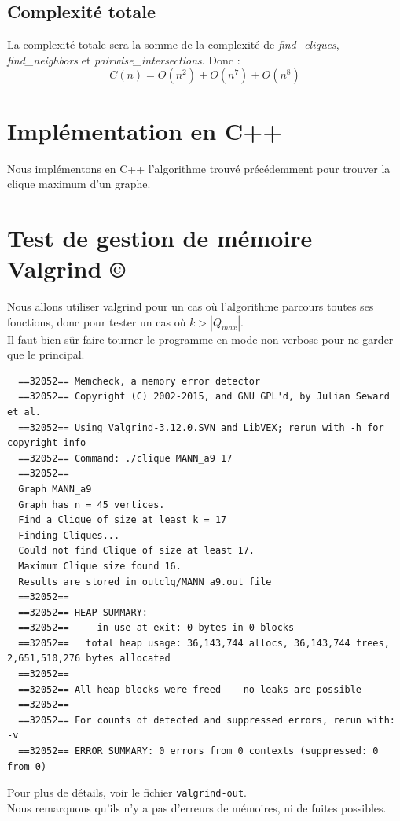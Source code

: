\documentclass{article}
\begin{document}
\subsection{Complexité totale}
La complexité totale sera la somme de la complexité de \textit{find\_cliques}, \textit{find\_neighbors}
et \textit{pairwise\_intersections}. Donc :
\begin{displaymath}
C(n)=O(n^2)+O(n^7)+O(n^8)
\end{displaymath}

\section{Implémentation en C++}
Nous implémentons en C++ l'algorithme trouvé précédemment pour trouver la clique
maximum d'un graphe.
\section{Test de gestion de mémoire Valgrind ©}
Nous allons utiliser valgrind pour un cas où l'algorithme parcours toutes ses fonctions, donc
pour tester un cas où $k > |Q_{max}|$.\\
Il faut bien sûr faire tourner le programme en mode non verbose pour ne garder que le principal.
\begin{verbatim}
  ==32052== Memcheck, a memory error detector
  ==32052== Copyright (C) 2002-2015, and GNU GPL'd, by Julian Seward et al.
  ==32052== Using Valgrind-3.12.0.SVN and LibVEX; rerun with -h for copyright info
  ==32052== Command: ./clique MANN_a9 17
  ==32052==
  Graph MANN_a9
  Graph has n = 45 vertices.
  Find a Clique of size at least k = 17
  Finding Cliques...
  Could not find Clique of size at least 17.
  Maximum Clique size found 16.
  Results are stored in outclq/MANN_a9.out file
  ==32052==
  ==32052== HEAP SUMMARY:
  ==32052==     in use at exit: 0 bytes in 0 blocks
  ==32052==   total heap usage: 36,143,744 allocs, 36,143,744 frees, 2,651,510,276 bytes allocated
  ==32052==
  ==32052== All heap blocks were freed -- no leaks are possible
  ==32052==
  ==32052== For counts of detected and suppressed errors, rerun with: -v
  ==32052== ERROR SUMMARY: 0 errors from 0 contexts (suppressed: 0 from 0)
\end{verbatim}
Pour plus de détails, voir le fichier \texttt{valgrind-out}.\\
Nous remarquons qu'ils n'y a pas d'erreurs de mémoires, ni de fuites possibles.
\end{document}
